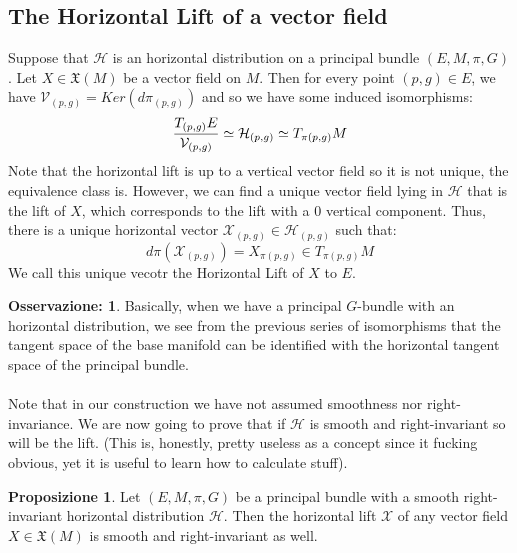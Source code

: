 \documentclass[12pt,a4paper]{report}
\theoremstyle{definition}
\theoremstyle{Theorem}
\newtheorem{Prop}[Def]{Proposizione}
\theoremstyle{definition}
\theoremstyle{definition}
\theoremstyle{definition}
\newtheorem{Obs}[Def]{Osservazione:}
\begin{document}
		\subsection{The Horizontal Lift of a vector field}
		Suppose that $\mathcal{H}$ is an horizontal distribution on a principal bundle $(E,M,\pi,G)$. Let $X\in\mathfrak{X}(M)$ be a vector field on $M$. Then for every point $(p,g)\in E$, we have $\mathcal{V}_{(p,g)}=Ker(d\pi_{(p,g)})$ and so we have some induced isomorphisms:
		$${T_{(p,g)}E\over \mathcal{V}_{(p,g)}}\simeq \mathcal{H}_{(p,g)}\simeq T_{\pi(p,g)}M$$
		Note that the horizontal lift is up to a vertical vector field so it is not unique, the equivalence class is. However, we can find a unique vector field lying in $\mathcal{H}$ that is the lift of $X$, which corresponds to the lift with a 0 vertical component.
		Thus, there is a unique horizontal vector $\mathcal{X}_{(p,g)}\in\mathcal{H}_{(p,g)}$ such that:
		$$d\pi(\mathcal{X}_{(p,g)})=X_{\pi(p,g)}\in T_{\pi(p,g)}M$$
		We call this unique vecotr the Horizontal Lift of $X$ to $E$.
		\begin{Obs}
			Basically, when we have a principal $G$-bundle with an horizontal distribution, we see from the previous series of isomorphisms that the tangent space of the base manifold can  be identified with the horizontal tangent space of the principal bundle.\\
			\\
			Note that in our construction we have not assumed smoothness nor right-invariance. We are now going to prove that if $\mathcal{H}$ is smooth and right-invariant so will be the lift. (This is, honestly, pretty useless as a concept since it fucking obvious, yet it is useful to learn how to calculate stuff).
		\end{Obs}
		\begin{Prop}
			Let $(E,M,\pi,G)$ be a principal bundle with a smooth right-invariant horizontal distribution $\mathcal{H}$. Then the horizontal lift $\mathcal{X}$ of any vector field $X\in\mathfrak{X}(M)$ is smooth and right-invariant as well.
		\end{Prop}
\end{document}
